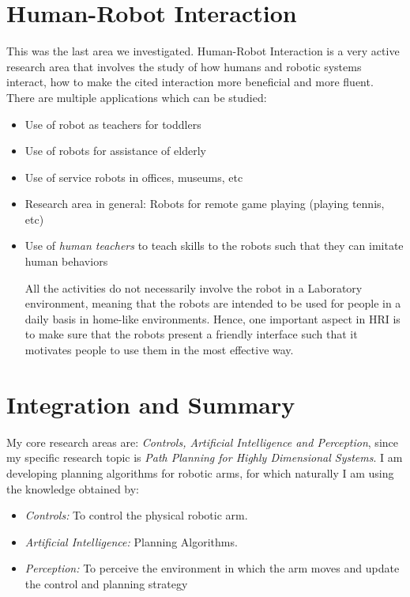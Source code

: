 \documentclass[10pt,a4paper]{article}
\begin{document}
\section{Human-Robot Interaction}
This was the last area we investigated. Human-Robot Interaction is a very active research area that involves the study of how humans and robotic systems interact, how to make the cited interaction more beneficial and more fluent. There are multiple applications which can be studied:

\begin{itemize}
\item{Use of robot as teachers for toddlers}
\item{Use of robots for assistance of elderly}
\item{Use of service robots in offices, museums, etc}
\item{Research area in general: Robots for remote game playing (playing tennis, etc)}
\item{Use of \textit{human teachers} to teach skills to the robots such that they can imitate human behaviors}

All the activities do not necessarily involve the robot in a Laboratory environment, meaning that the robots are intended to be used for people in a daily basis in home-like environments. Hence, one important aspect in HRI is to make sure that the robots present a friendly interface such that it motivates people to use them in the most effective way.
\end{itemize}

\section{Integration and Summary}
My core research areas are: \textit{Controls, Artificial Intelligence and Perception}, since my specific research topic is \textit{Path Planning for Highly Dimensional Systems}. I am developing planning algorithms for robotic arms, for which naturally I am using the knowledge obtained by:

\begin{itemize}
\item{\textit{Controls:} To control the physical robotic arm.}
\item{\textit{Artificial Intelligence:} Planning Algorithms.}
\item{\textit{Perception:} To perceive the environment in which the arm moves and update the control and planning strategy}
\end{itemize}
\end{document}
